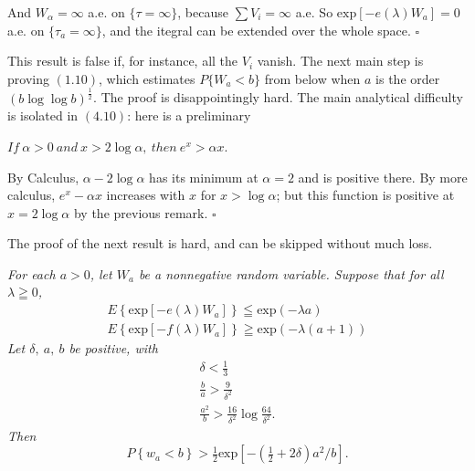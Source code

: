 \documentclass[14pt,a4paper, leqno]{scrartcl}
\begin{document}
And $W_{\alpha}=\infty$ a.e. on $\{ \tau = \infty\}$, because $\sum V_i = \infty$ a.e. So $\text{exp}[-e(\lambda)W_a]=0$
a.e. on $\{ \tau_a = \infty \}$, and the itegral can be extended over the whole space. $\square$

This result is false if, for instance, all the $V_i$ vanish. The next main step is proving $(1.10)$, which estimates $P\{W_a < b \}$ from
below when $a$ is the order $(b \log \log b)^{\frac{1}{2}} $. The proof is disappointingly hard. The main analytical difficulty is isolated in
$(4.10)$: here is a preliminary
\newenvironment{Lem}
{\par{}}
{\hfill }
\begin{Lem}
$If \  \alpha > 0 \  and \  x > 2 \log \alpha, \ then \ e^x > \alpha x$.
\end{Lem}

\newenvironment {Proof}
{\par{}}
{$\square$}

\begin{Proof}
By Calculus, $\alpha - 2 \log\alpha$ has its minimum at $\alpha = 2$ and is positive there. By more calculus, $e^x - \alpha x$ increases
with $x$ for $x > \log \alpha$; but this function is positive at $x = 2 \log \alpha$ by the previous remark.
\end{Proof}

The proof of the next result is hard, and can be skipped without much loss.

\newenvironment{Prop}
{\par{}}
{\hfill }
\begin{Prop}
{\it For each $a > 0$,  let $W_a$  be  a  nonnegative  random  variable.  Suppose that for all $\lambda \geqq 0$,}
	\begin{gather}
		E\left\{ \text{exp}\left[ - e(\lambda) W_a\right] \right\} \leqq \text{exp}\left(-\lambda a\right) \\
		E\left\{ \text{exp}\left[ - f(\lambda) W_a\right] \right\} \geqq \text{exp}\left(-\lambda (a+1) \right) \label{ref1}
	\end{gather}
{\it Let $\delta, \ a, \ b$ be positive, with}
	\begin{gather}
		\delta < \tfrac{1}{3} \\
		\frac{b}{a} > \frac{9}{\delta^2} \\
		\frac{a^2}{b} > \frac{16}{\delta^2}\log \frac{64}{\delta^2}.
	\end{gather}
{\it Then}
	\begin{equation}
		P\left\{ w_a < b \right\} > \tfrac{1}{2} \text{exp}\left[-\left( \tfrac{1}{2} + 2\delta\right)a^2/b\right].
	\end{equation}
\end{Prop}
\end{document}

